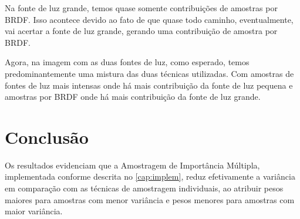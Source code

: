 Na fonte de luz grande, temos quase somente contribuições de amostras por BRDF.
Isso acontece devido ao fato de que quase todo caminho, eventualmente, vai
acertar a fonte de luz grande, gerando uma contribuição de amostra por BRDF.

Agora, na imagem com as duas fontes de luz, como esperado, temos
predominantemente uma mistura das duas técnicas utilizadas. Com amostras de
fontes de luz mais intensas onde há mais contribuição da fonte de luz pequena e
amostras por BRDF onde há mais contribuição da fonte de luz grande.

\section{Conclusão}

Os resultados evidenciam que a Amostragem de Importância Múltipla, implementada
conforme descrita no \autoref{cap:implem}, reduz efetivamente a
variância em comparação com as técnicas de amostragem individuais, ao atribuir
pesos maiores para amostras com menor variância e pesos menores para amostras
com maior variância.

